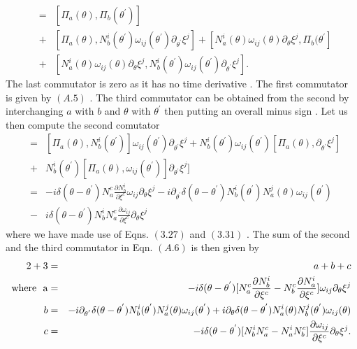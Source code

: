 \documentclass[a4paper,12pt]{article}
\begin{document}
\begin{eqnarray}
[\frac{-2iAR}{\gamma}J^{0}_a({\theta}),
\frac{-2iAR}{\gamma}J^{0}_b({\theta}^{'})]
&=&[{\Pi}_{a}(\theta),{\Pi}_{b}({\theta}^{'})]\nonumber\\
&+& [{\Pi}_{a}(\theta) , N_{b}^{i}({\theta}^{'}){\omega}_{ij}({\theta}^{'})
{\partial}_{{\theta}^{'}}{\xi}^{j}] + 
[N_{a}^{i}(\theta){\omega}_{ij}(\theta){\partial}_{\theta}{\xi}^j , 
{\Pi}_b({\theta}^{'}]\nonumber\\ 
&+&[N_{a}^{i}(\theta){\omega}_{ij}(\theta){\partial}_{\theta}{\xi}^{j}, 
N_{b}^{i}({\theta}^{'}){\omega}_{ij}({\theta}^{'})
{\partial}_{{\theta}^{'}}{\xi}^{j}].
\end{eqnarray}
The last commutator is  zero as it has 
 no time derivative . The first commutator is given by $(A.5)$ . The third
 commutator can be obtained from the second by
 interchanging $a$ with $b$ and ${\theta}$ with ${\theta}^{'}$ then
 putting an overall minus sign . Let us then compute the second comutator 
\begin{eqnarray}
[{\Pi}_{a}(\theta) , 
N_{b}^{i}({\theta}^{'}){\omega}_{ij}
({\theta}^{'}){\partial}_{{\theta}^{'}}{\xi}^{j}]&=&[{\Pi}_{a}(\theta) , 
N_{b}^{i}({\theta}^{'})]{\omega}_{ij}({\theta}^{'})
{\partial}_{{\theta}^{'}}{\xi}^{j} + 
N_{b}^{i}({\theta}^{'}){\omega}_{ij}({\theta}^{'})
[{\Pi}_{a}(\theta),{\partial}_{{\theta}^{'}}{\xi}^{j}]\nonumber\\
&+&N_{b}^{i}({\theta}^{'})[{\Pi}_{a}(\theta),
{\omega}_{ij}({\theta}^{'})]{\partial}_{{\theta}^{'}}{\xi}^{j}]\nonumber\\
&=&-i{\delta}(\theta -{\theta}^{'})
N_{a}^{c}\frac{{\partial}N_b^i}
{\partial{\xi}^c}{\omega}_{ij}
{\partial}_{\theta}{\xi}^{j} 
-i{\partial}_{{\theta}^{'}}{\delta}
(\theta -{\theta}^{'})N_{b}^{i}({\theta}^{'}) 
N_a^j(\theta) {\omega}_{ij}({\theta}^{'})\nonumber\\
&-&i{\delta}(\theta -{\theta}^{'})
N_{b}^{i}N_{a}^{c}\frac{{\partial}{\omega}_{ij}}{{\partial}{\xi}^c}
{\partial}_{\theta}{\xi}^j
\end{eqnarray}
where we have made use of Eqns. $(3.27)$ and $(3.31)$ . The sum
 of the second and the third commutator in Eqn. $(A.6)$ is then given by
\begin{eqnarray}
2+3&=&a + b +c\nonumber\\
\rm{where}~
~a&=&-i{\delta}(\theta -
{\theta}^{'})[N_{a}^{c}\frac{{\partial}N_b^i}
{\partial{\xi}^c}-N_{b}^{c}\frac{{\partial}N_a^i}{{\partial}{\xi}^c}]
{\omega}_{ij}{\partial}_{\theta}{\xi}^{j}\nonumber\\
b&=&-i{\partial}_{{\theta}^{'}}{\delta}
(\theta -{\theta}^{'})N_{b}^{i}({\theta}^{'}) 
N_a^j(\theta) {\omega}_{ij}({\theta}^{'})+
i{\partial}_{{\theta}}{\delta}(\theta -
{\theta}^{'})N_{a}^{i}({\theta}) N_b^j({\theta}^{'}) 
{\omega}_{ij}({\theta})\nonumber\\
c&=&-i{\delta}(\theta -{\theta}^{'})
[N_{b}^{i}N_a^c-N_a^iN_b^c]\frac{{\partial}{\omega}_{ij}}{{\partial{\xi}^c}}
\partial_{\theta}{\xi}^j.
\end{eqnarray}
\end{document}
